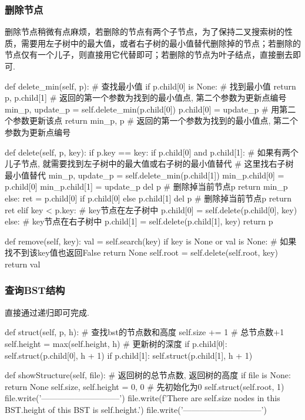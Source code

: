 \documentclass[12pt, a4paper, oneside]{ctexart}
\numberwithin{equation}{section}  %
\begin{document}
\subsubsection{删除节点}
删除节点稍微有点麻烦，若删除的节点有两个子节点，为了保持二叉搜索树的性质，需要用左子树中的最大值，或者右子树的最小值替代删除掉的节点；若删除的节点仅有一个儿子，则直接用它代替即可；若删除的节点为叶子结点，直接删去即可.
\begin{pythoncode}
def delete_min(self, p):  # 查找最小值
    if p.child[0] is None:  # 找到最小值
        return p, p.child[1]  # 返回的第一个参数为找到的最小值点, 第二个参数为更新点编号
    min_p, update_p = self.delete_min(p.child[0])
    p.child[0] = update_p  # 用第二个参数更新该点
    return min_p, p  # 返回的第一个参数为找到的最小值点, 第二个参数为更新点编号

def delete(self, p, key):
    if p.key == key:
        if p.child[0] and p.child[1]:  # 如果有两个儿子节点, 就需要找到左子树中的最大值或右子树的最小值替代
            # 这里找右子树最小值替代
            min_p, update_p = self.delete_min(p.child[1])
            min_p.child[0] = p.child[0]
            min_p.child[1] = update_p
            del p  # 删除掉当前节点p
            return min_p
        else:
            ret = p.child[0] if p.child[0] else p.child[1]
            del p  # 删除掉当前节点p
            return ret
    elif key < p.key:  # key节点在左子树中
        p.child[0] = self.delete(p.child[0], key)
    else:  # key节点在右子树中
        p.child[1] = self.delete(p.child[1], key)
    return p

def remove(self, key):
    val = self.search(key)
    if key is None or val is None:  # 如果找不到该key值也返回False
        return None
    self.root = self.delete(self.root, key)
    return val
\end{pythoncode}
\subsubsection{查询BST结构}
直接通过递归即可完成.
\begin{pythoncode}
def struct(self, p, h):  # 查找bst的节点数和高度
    self.size += 1  # 总节点数+1
    self.height = max(self.height, h)  # 更新树的深度
    if p.child[0]:
        self.struct(p.child[0], h + 1)
    if p.child[1]:
        self.struct(p.child[1], h + 1)

def showStructure(self, file):  # 返回树的总节点数, 返回树的高度
    if file is None:
        return None
    self.size, self.height = 0, 0  # 先初始化为0
    self.struct(self.root, 1)
    file.write('-----------------------------\n')
    file.write(f'There are {self.size} nodes in this BST.\nThe height of this BST is {self.height}.\n')
    file.write('-----------------------------\n')
\end{pythoncode}
\end{document}
